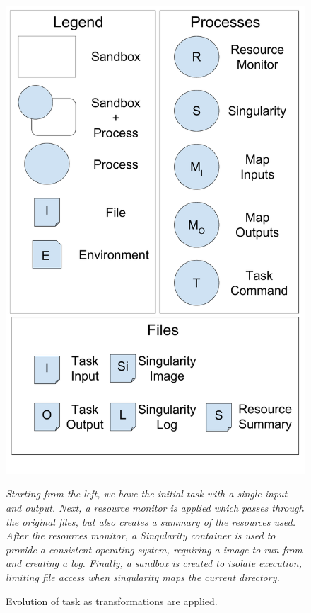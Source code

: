 \documentclass[conference]{IEEEtran}
\begin{document}
\begin{figure}[t]
\begin{minipage}[t]{0.22\textwidth}
  \includegraphics[width=\textwidth]{graphics/nested_legend.pdf}
\end{minipage}
\caption{Evolution of task as transformations are applied.} 
\small
\emph{ 
Starting from the left,
we have the initial task 
with a single input and output. 
Next, a resource monitor is applied which 
passes through the original files, 
but also creates a summary of the resources used.
After the resources monitor, a Singularity container
is used to provide a consistent operating system,
requiring a image to run from and creating a log.
Finally, a sandbox is created to isolate execution, 
limiting file access when singularity 
maps the current directory.
}
\label{figure:wrapping-of-task}
\end{figure}
\end{document}
